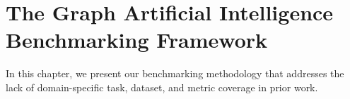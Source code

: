
\renewcommand{\thechapter}{4}
\chapter{The Graph Artificial Intelligence Benchmarking Framework}
\label{chapter:40-Graph-AI-Benchmarking}
In this chapter, we present our \gai benchmarking methodology that addresses the lack of domain-specific task, dataset, and metric coverage in prior work.









% 

